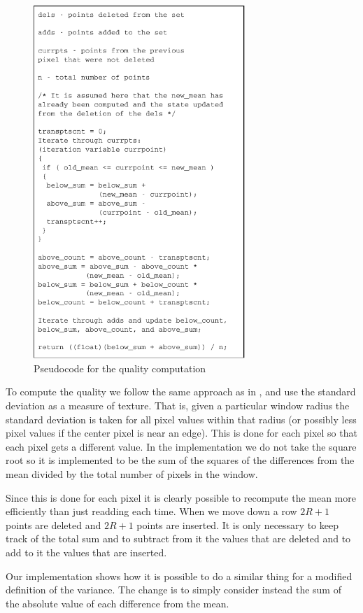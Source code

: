 \documentclass[twocolumn]{article}
\begin{document}
 
\begin{figure}[!t]
\centering
\includegraphics[width=3.15in]{quality}
\caption{Pseudocode for the quality computation}
\label{fig:quality}
\end{figure}

To compute the quality we follow the same approach as in \cite{prev},
and use the standard deviation as a measure of texture. That is, given
a particular window radius the standard deviation is taken for all
pixel values within that radius (or possibly less pixel values if the
center pixel is near an edge). This is done for each pixel so that
each pixel gets a different value. In the implementation we do not
take the square root so it is implemented to be the sum of the squares
of the differences from the mean divided by the total number of pixels
in the window.

Since this is done for each pixel it is clearly possible to
recompute the mean more efficiently than just readding each
time. When we move down a row $2R+1$ points are deleted and $2R+1$
points are inserted. It is only necessary to keep track of the
total sum and to subtract from it the values that are deleted
and to add to it the values that are inserted.  

Our implementation shows how it is possible to do a similar
thing for a modified definition of the variance. The change is
to simply consider instead the sum of the absolute value of
each difference from the mean. 
\end{document}
